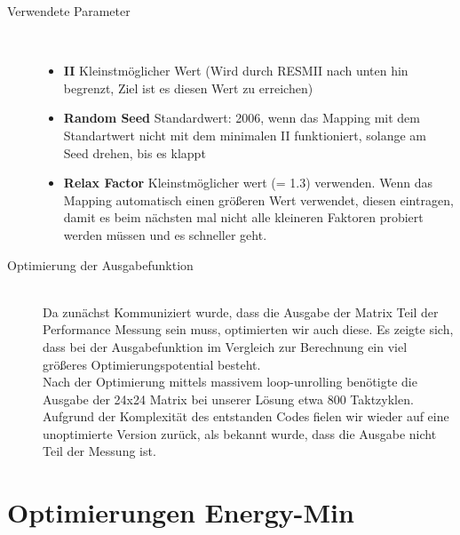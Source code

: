 \documentclass[oneside,11pt,accentcolor=tud2b, nochapname]{tudexercise}
\begin{document}
\begin{description}
	\item[Verwendete Parameter] \hfill \\
	\begin{itemize}
		\item \textbf{II} Kleinstmöglicher Wert (Wird durch RESMII nach unten hin begrenzt, Ziel ist es diesen Wert zu erreichen)
		\item \textbf{Random Seed} Standardwert: 2006, wenn das Mapping mit dem Standartwert nicht mit dem minimalen II funktioniert, solange am Seed drehen, bis es klappt
		\item \textbf{Relax Factor} Kleinstmöglicher wert (= 1.3) verwenden.
			Wenn das Mapping automatisch einen größeren Wert verwendet, diesen eintragen, damit es beim nächsten mal nicht alle kleineren Faktoren probiert werden müssen und es schneller geht.
	\end{itemize}
	
	\item[Optimierung der Ausgabefunktion] \hfill \\
	Da zunächst Kommuniziert wurde, dass die Ausgabe der Matrix Teil der Performance Messung sein muss, optimierten wir auch diese.
	Es zeigte sich, dass bei der Ausgabefunktion im Vergleich zur Berechnung ein viel größeres Optimierungspotential besteht.\\
	Nach der Optimierung mittels massivem loop-unrolling benötigte die Ausgabe der 24x24 Matrix bei unserer Lösung etwa 800 Taktzyklen.
	Aufgrund der Komplexität des entstanden Codes fielen wir wieder auf eine unoptimierte Version zurück, als bekannt wurde, dass die Ausgabe nicht Teil der Messung ist.
	
\end{description}

\section*{Optimierungen Energy-Min}
\end{document}
